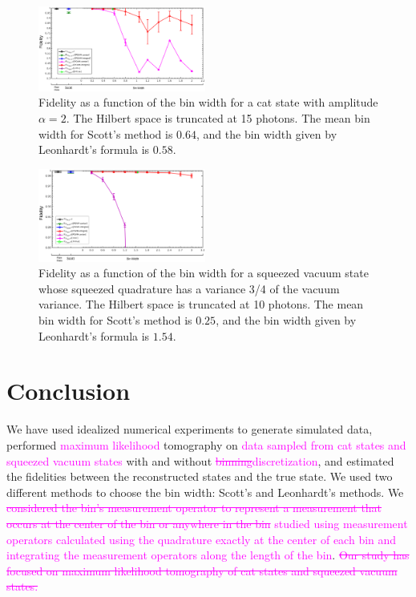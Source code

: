\documentclass[
reprint,
superscriptaddress,
showpacs,
amsmath,
amssymb,
aps,
pra,
longbibliography
]{revtex4-1}
\providecommand{\aucmnt}[1]{#1}
\providecommand{\editcolor}[2]{\textcolor{#1}{#2}}
\providecommand{\aucmnt}[1]{}
\providecommand{\editcolor}[2]{#2}
\newcommand{\SG}[1]{\editcolor{magenta}{#1}}
\newcommand{\SGs}[1]{\aucmnt{\editcolor{magenta}{\sout{#1}}}}
\begin{document}
\begin{figure}
  \includegraphics[width=0.49\textwidth]{fidelity_vs_binwidth_catstate_alpha_2.eps}
  \caption{Fidelity as a function of the bin width for a cat state
    with amplitude $\alpha = 2$. The Hilbert space is truncated at 15
    photons. The mean bin width for Scott's method is $0.64$, and the
    bin width given by Leonhardt's formula is $0.58$.}
  \label{fig-Fid_vs_binwidth_catstate_alpha_2_Mph_15}
\end{figure}

\begin{figure}
  \includegraphics[width=0.49\textwidth]{squeezed_vacuum_variance_075_Mph_10.eps}
  \caption{Fidelity as a function of the bin width for a squeezed
    vacuum state whose squeezed quadrature has a variance 3/4 of the
    vacuum variance. The Hilbert space is truncated at 10 photons. The
    mean bin width for Scott's method is $0.25$, and the bin width
    given by Leonhardt's formula is $1.54$.}
  \label{fig-squeezed_vacuum_variance_075_Mph_10}
\end{figure}

\section{Conclusion}
\label{conclusion}

We have used idealized numerical experiments to generate simulated
data, performed \SG{maximum likelihood} tomography on \SG{data sampled
  from cat states and squeezed vacuum states} with and without
\SGs{binning}\SG{discretization}, and estimated the fidelities between
the reconstructed states and the true state. We used two different
methods to choose the bin width: Scott's and Leonhardt's methods. We
\SGs{considered the bin's measurement operator to represent a
  measurement that occurs at the center of the bin or anywhere in the
  bin} \SG{studied using measurement operators calculated using the
  quadrature exactly at the center of each bin and integrating the
  measurement operators along the length of the bin}. \SGs{Our study
  has focused on maximum likelihood tomography of cat states and
  squeezed vacuum states.}
\end{document}
